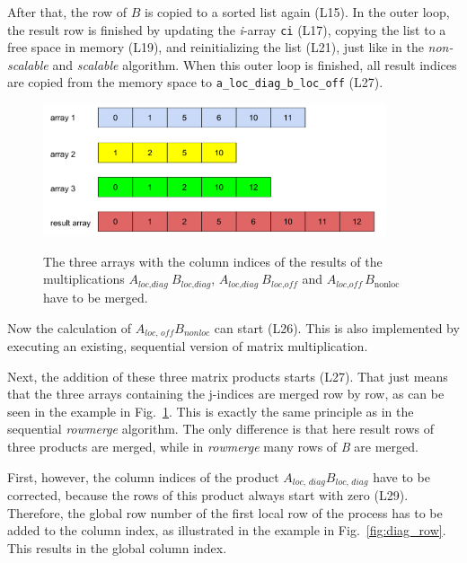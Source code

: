 After that, the row of $B$ is copied to a sorted list again (L15). In the outer loop, the result row is finished by updating the \textit{i}-array \texttt{ci} (L17), copying the list to a free space in memory (L19), and reinitializing the list (L21), just like in the \textit{non-scalable} and \textit{scalable} algorithm. When this outer loop is finished, all result indices are copied from the memory space to \texttt{a\_loc\_diag\_b\_loc\_off} (L27).

\begin{figure}[tbp]
\centering
\vspace{5mm}
{\includegraphics[width=0.9\textwidth]{mm_rowmerge}}
\caption{The three arrays with the column indices of the results of the multiplications $A_{\textit{loc,diag~}}B_{\textit{loc,diag}}$, $A_{\textit{loc,diag~}} B_{\textit{loc,off}}$ and $A_{\textit{loc,off}~} B_{\textrm{nonloc}}$ have to be merged.}
\label{fig:rowmerge}
\end{figure}

Now the calculation of $A_{\textit{loc, off}} B_{\textit{nonloc}}$ can start (L26). This is also implemented by executing an existing, sequential version of matrix multiplication. 

Next, the addition of these three matrix products starts (L27). That just means that the three arrays containing the j-indices are merged row by row, as can be seen in the example in Fig.~\ref{fig:rowmerge}. This is exactly the same principle as in the sequential \textit{rowmerge} algorithm. The only difference is that here result rows of three products are merged, while in \textit{rowmerge} many rows of \textit{B} are merged.


First, however, the column indices of the product $A_{\textit{loc, diag}}B_{\textit{loc, diag}}$ have to be corrected, because the rows of this product always start with zero (L29). Therefore, the global row number of the first local row of the process has to be added to the column index, as illustrated in the example in Fig.~\ref{fig:diag_row}. This results in the global column index.

